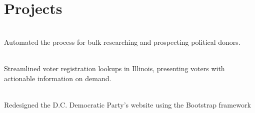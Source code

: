 
\section{Projects}

\\
Automated the process for bulk researching and prospecting political donors.
\sectionsep

\\
Streamlined voter registration lookups in Illinois, presenting voters with actionable information on demand.
\sectionsep

\\
Redesigned the D.C. Democratic Party's website using the Bootstrap framework
\sectionsep